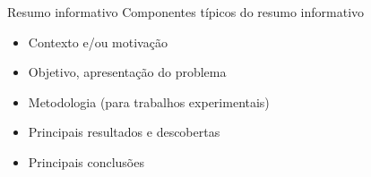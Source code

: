 \documentclass{beamer}
\begin{document}
\begin{frame}{Resumo informativo}
  Componentes típicos do resumo informativo
  \begin{itemize}
  \item Contexto e/ou motivação
  \item Objetivo, apresentação do problema
  \item Metodologia (para trabalhos experimentais)
  \item Principais resultados e descobertas
  \item Principais conclusões
  \end{itemize}
\end{frame}




\end{document}

